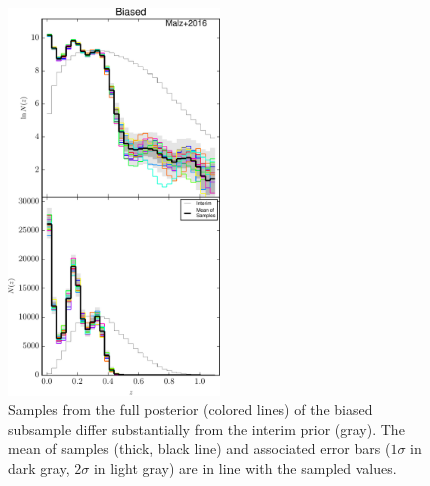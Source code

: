 \documentclass[preprint]{aastex}
\begin{document}
\begin{figure}
\includegraphics[width=0.5\textwidth]{figs/bias/samps.pdf}
\caption{Samples from the full posterior (colored lines) of the biased 
subsample differ substantially from the interim prior (gray).  The mean of 
samples (thick, black line) and associated error bars ($1\sigma$ in dark gray, 
$2\sigma$ in light gray) are in line with the sampled values.}
\label{fig:biasparam}
\end{figure}
\end{document}
